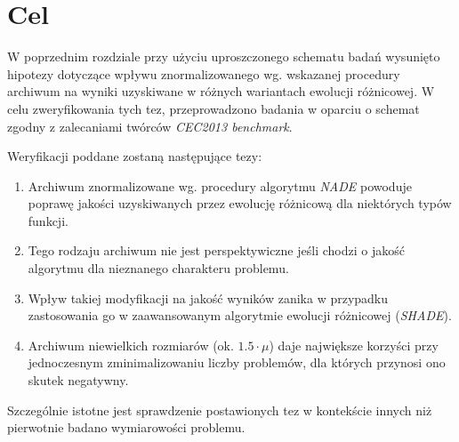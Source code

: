 \documentclass[12pt,a4paper]{report}
\begin{document}
{{{{{{\section{Cel}
\par{
W poprzednim rozdziale przy użyciu uproszczonego schematu badań wysunięto hipotezy dotyczące wpływu znormalizowanego wg. wskazanej procedury archiwum na wyniki uzyskiwane w różnych wariantach ewolucji różnicowej. W celu zweryfikowania tych tez, przeprowadzono badania w oparciu o schemat zgodny z zalecaniami twórców \emph{CEC2013 benchmark}.
}
\par{
Weryfikacji poddane zostaną następujące tezy:
\begin{enumerate}
\item Archiwum znormalizowane wg. procedury algorytmu \emph{NADE} powoduje poprawę jakości uzyskiwanych przez ewolucję różnicową dla niektórych typów funkcji.
\item Tego rodzaju archiwum nie jest perspektywiczne jeśli chodzi o jakość algorytmu dla nieznanego charakteru problemu.
\item Wpływ takiej modyfikacji na jakość wyników zanika w przypadku zastosowania go w zaawansowanym algorytmie ewolucji różnicowej (\emph{SHADE}).
\item Archiwum niewielkich rozmiarów (ok. $1.5 \cdot \mu$) daje największe korzyści przy jednoczesnym zminimalizowaniu liczby problemów, dla których przynosi ono skutek negatywny.
\end{enumerate}
}
\par{
Szczególnie istotne jest sprawdzenie postawionych tez w kontekście innych niż pierwotnie badano wymiarowości problemu.
}

}}}}}}
\end{document}
